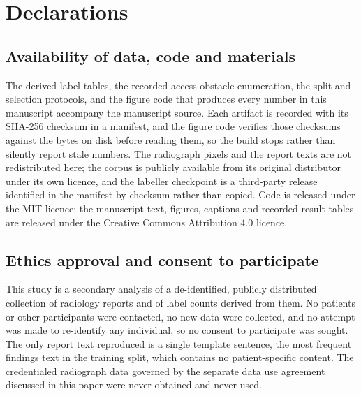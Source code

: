 \section*{Declarations}

\subsection*{Availability of data, code and materials}

The derived label tables, the recorded access-obstacle enumeration, the split
and selection protocols, and the figure code that produces every number in
this manuscript accompany the manuscript source. Each artifact is recorded
with its SHA-256 checksum in a manifest, and the figure code verifies those
checksums against the bytes on disk before reading them, so the build stops
rather than silently report stale numbers. The radiograph pixels and the
report texts are not redistributed here; the corpus is publicly available from
its original distributor under its own licence, and the labeller checkpoint is
a third-party release identified in the manifest by checksum rather than
copied. Code is released under the MIT licence; the manuscript text, figures,
captions and recorded result tables are released under the Creative Commons
Attribution 4.0 licence.


\subsection*{Ethics approval and consent to participate}

This study is a secondary analysis of a de-identified, publicly distributed
collection of radiology reports and of label counts derived from them. No
patients or other participants were contacted, no new data were collected, and
no attempt was made to re-identify any individual, so no consent to
participate was sought. The only report text reproduced is a single template
sentence, the most frequent findings text in the training split, which
contains no patient-specific content. The credentialed radiograph data
governed by the separate data use agreement discussed in this paper were
never obtained and never used.

